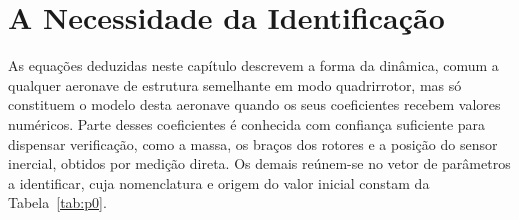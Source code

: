 {\color{blue}
\section[{\color{blue}A Necessidade da Identificação}]{{\color{blue}A Necessidade da Identificação}}
\label{sec:necessidade-ident}

As equações deduzidas neste capítulo descrevem a forma da dinâmica, comum a qualquer aeronave de estrutura semelhante em modo quadrirrotor, mas só constituem o modelo desta aeronave quando os seus coeficientes recebem valores numéricos. Parte desses coeficientes é conhecida com confiança suficiente para dispensar verificação, como a massa, os braços dos rotores e a posição do sensor inercial, obtidos por medição direta. Os demais reúnem-se no vetor de parâmetros a identificar, cuja nomenclatura e origem do valor inicial constam da Tabela~\ref{tab:p0}.

}
